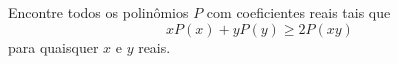 Encontre todos os polinômios $P$ com coeficientes reais tais que $$xP(x) + yP(y) \ge 2P(xy)$$ para quaisquer $x$ e $y$ reais.
